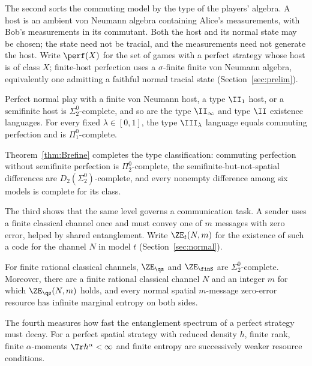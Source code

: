 The second sorts the commuting model by the type of the players' algebra. A host is an ambient von Neumann algebra containing Alice's measurements, with Bob's measurements in its commutant. Both the host and its normal state may be chosen; the state need not be tracial, and the measurements need not generate the host. Write $\perf(X)$ for the set of games with a perfect strategy whose host is of class $X$; finite-host perfection uses a $\sigma$-finite finite von Neumann algebra, equivalently one admitting a faithful normal tracial state (Section~\ref{sec:prelim}).

\begin{theoremB}\label{thm:B}
Perfect normal play with a finite von Neumann host, a type $\II_1$ host, or a semifinite host is $\Sigma^0_2$-complete, and so are the type $\II_\infty$ and type $\II$ existence languages. For every fixed $\lambda\in[0,1]$, the type $\III_\lambda$ language equals commuting perfection and is $\Pi^0_1$-complete.
\end{theoremB}

Theorem~\ref{thm:Brefine} completes the type classification: commuting perfection without semifinite perfection is $\Pi^0_2$-complete, the semifinite-but-not-spatial differences are $D_2(\Sigma^0_2)$-complete, and every nonempty difference among six models is complete for its class.

The third shows that the same level governs a communication task. A sender uses a finite classical channel once and must convey one of $m$ messages with zero error, helped by shared entanglement. Write $\ZE_t(N,m)$ for the existence of such a code for the channel $N$ in model $t$ (Section~\ref{sec:normal}).

\begin{theoremC}\label{thm:C}
For finite rational classical channels, $\ZE_{\qs}$ and $\ZE_{\finS}$ are $\Sigma^0_2$-complete. Moreover, there are a finite rational classical channel $N$ and an integer $m$ for which $\ZE_{\qs}(N,m)$ holds, and every normal spatial $m$-message zero-error resource has infinite marginal entropy on both sides.
\end{theoremC}

The fourth measures how fast the entanglement spectrum of a perfect strategy must decay. For a perfect spatial strategy with reduced density $h$, finite rank, finite $\alpha$-moments $\Tr h^\alpha<\infty$ and finite entropy are successively weaker resource conditions.

